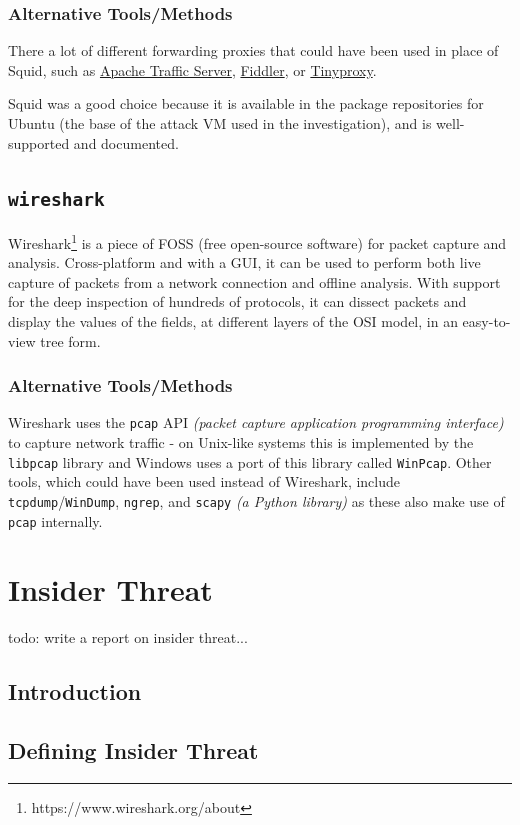 \documentclass[12pt]{report}
\begin{document}
\subsection*{Alternative Tools/Methods}
There a lot of different forwarding proxies that could have been used in place of Squid, such as \href{https://docs.trafficserver.apache.org/en/5.3.x/admin/forward-proxy.en.html}{Apache Traffic Server}, \href{https://www.telerik.com/fiddler}{Fiddler}, or \href{https://tinyproxy.github.io/}{Tinyproxy}.

Squid was a good choice because it is available in the package repositories for Ubuntu (the base of the attack VM used in the investigation), and is well-supported and documented.

\section{\texttt{wireshark}}
Wireshark\footnote{https://www.wireshark.org/about} is a piece of FOSS (free open-source software) for packet capture and analysis. Cross-platform and with a GUI, it can be used to perform both live capture of packets from a network connection and offline analysis. With support for the deep inspection of hundreds of protocols, it can dissect packets and display the values of the fields, at different layers of the OSI model, in an easy-to-view tree form.
\subsection*{Alternative Tools/Methods}
Wireshark uses the \texttt{pcap} API \textit{(packet capture application programming interface)} to capture network traffic - on Unix-like systems this is implemented by the \texttt{libpcap} library and Windows uses a port of this library called \texttt{WinPcap}. Other tools, which could have been used instead of Wireshark, include \texttt{tcpdump}/\texttt{WinDump}, \texttt{ngrep}, and \texttt{scapy} \textit{(a Python library)} as these also make use of \texttt{pcap} internally.


\pagebreak
\chapter{Insider Threat}
todo: write a report on insider threat...
\section{Introduction}
\section{Defining Insider Threat}
\end{document}
